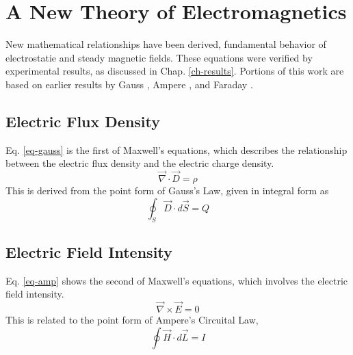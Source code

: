 \chapter{A New Theory of Electromagnetics}

New mathematical relationships have been derived,
fundamental behavior of electrostatie and steady magnetic fields.
These equations were verified by experimental results, as discussed in
Chap. \ref{ch-results}.
Portions of this work are based on earlier results by Gauss \cite{Gauss},
Ampere \cite{Ampere}, and Faraday \cite{Faraday}.

\section{Electric Flux Density}

Eq. \ref{eq-gauss} is the first of Maxwell's equations, which describes the
relationship between the electric flux density and the electric charge density.
\begin{equation}
\vec{\nabla} \cdot \vec{D} = \rho
\label{eq-gauss}
\end{equation}
This is derived from the point form of Gauss's Law, given in integral form as
\begin{equation}
\oint_S \vec{D} \cdot d\vec{S} = Q
\end{equation}

\section{Electric Field Intensity}

Eq. \ref{eq-amp} shows the second of Maxwell's equations, which involves the
electric field intensity.
\begin{equation}
\vec{\nabla} \times \vec{E} = 0
\label{eq-amp}
\end{equation}
This is related to the point form of Ampere's Circuital Law,
\begin{equation}
\oint \vec{H} \cdot d\vec{L} = I
\end{equation}

